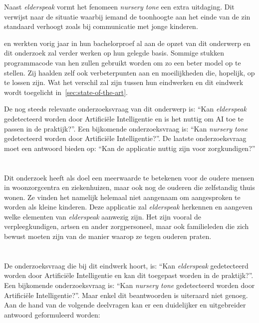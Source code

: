 Naast \textit{elderspeak} vormt het fenomeen \textit{nursery tone} een extra uitdaging. Dit verwijst naar de situatie waarbij iemand de toonhoogte aan het einde van de zin standaard verhoogt zoals bij communicatie met jonge kinderen.

\textcite{Beeckman2021} en \textcite{Standaert2021} werkten vorig jaar in hun bachelorproef al aan de opzet van dit onderwerp en dit onderzoek zal verder werken op hun gelegde basis.
Sommige stukken programmacode van hen zullen gebruikt worden om zo een beter model op te stellen.
Zij haalden zelf ook verbeterpunten aan en moeilijkheden die, hopelijk, op te lossen zijn. Wat het verschil zal zijn tussen hun eindwerken en dit eindwerk wordt toegelicht in~\ref{sec:state-of-the-art}.

De nog steeds relevante onderzoeksvraag van dit onderwerp is: ``Kan \textit{elderspeak} gedetecteerd worden door Artificiële Intelligentie en is het nuttig om AI toe te passen in de praktijk?''. Een bijkomende onderzoeksvraag is: ``Kan \textit{nursery tone} gedetecteerd worden door Artificiële Intelligentie?''. De laatste onderzoeksvraag moet een antwoord bieden op: ``Kan de applicatie nuttig zijn voor zorgkundigen?''

\section{}
\label{sec:probleemstelling}

Dit onderzoek heeft als doel een meerwaarde te betekenen voor de oudere mensen in woonzorgcentra en ziekenhuizen, maar ook nog de ouderen die zelfstandig thuis wonen. Ze vinden het namelijk helemaal niet aangenaam om aangesproken te worden als kleine kinderen. Deze applicatie zal \textit{elderspeak} herkennen en aangeven welke elementen van \textit{elderspeak} aanwezig zijn. Het zijn vooral de verpleegkundigen, artsen en ander zorgpersoneel, maar ook familieleden die zich bewust moeten zijn van de manier waarop ze tegen ouderen praten.

\section{}
\label{sec:onderzoeksvraag}

De onderzoeksvraag die bij dit eindwerk hoort, is: ``Kan \textit{elderspeak} gedetecteerd worden door Artificiële Intelligentie en kan dit toegepast worden in de praktijk?''. Een bijkomende onderzoeksvraag is: ``Kan \textit{nursery tone} gedetecteerd worden door Artificiële Intelligentie?''. Maar enkel dit beantwoorden is uiteraard niet genoeg.
Aan de hand van de volgende deelvragen kan er een duidelijker en uitgebreider antwoord geformuleerd worden:


